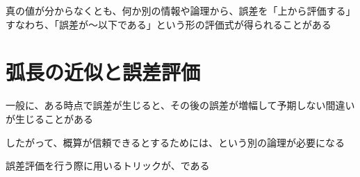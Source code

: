 \documentclass[../book_jiriki_calc]{subfiles}
\begin{document}
\sectionline

真の値が分からなくとも、何か別の情報や論理から、誤差を「上から評価する」すなわち、「誤差が〜以下である」という形の評価式が得られることがある

\section*{弧長の近似と誤差評価}

一般に、ある時点で誤差が生じると、その後の誤差が増幅して予期しない間違いが生じることがある

したがって、概算が信頼できるとするためには、という別の論理が必要になる

誤差評価を行う際に用いるトリックが、である
\end{document}
